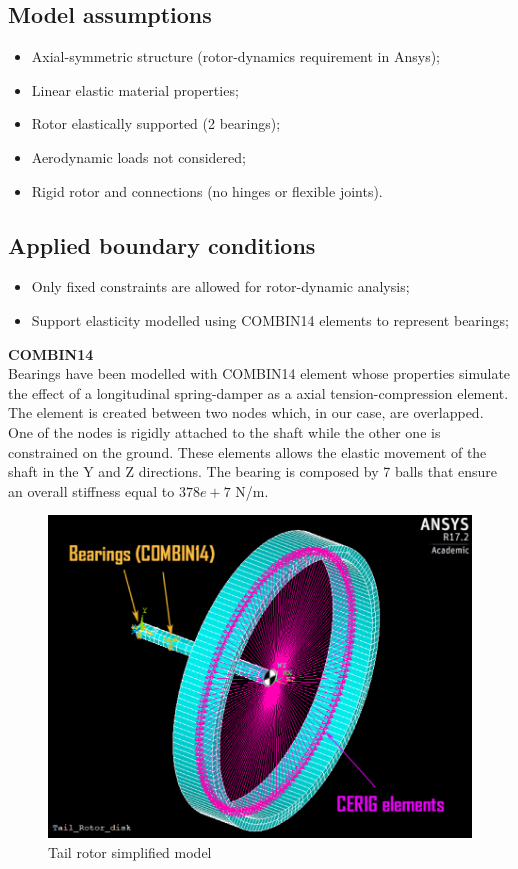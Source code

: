 \subsection*{Model assumptions}
\begin{itemize}
	\item Axial-symmetric structure (rotor-dynamics requirement in Ansys);
	\item Linear elastic material properties;
	\item Rotor elastically supported (2 bearings);
	\item Aerodynamic loads not considered;
	\item Rigid rotor and connections (no hinges or flexible joints).
\end{itemize}



\subsection*{Applied boundary conditions}
\noindent
\begin{itemize}
	\item Only fixed constraints are allowed for rotor-dynamic analysis;
	\item Support elasticity modelled using COMBIN14 elements to represent bearings;
\end{itemize}

\noindent
\textbf{COMBIN14} \\
Bearings have been modelled with COMBIN14 element whose properties simulate the effect of a longitudinal spring-damper as a axial tension-compression element.
The element is created between two nodes which, in our case, are overlapped. One of the nodes is rigidly attached to the shaft while the other one is constrained on the ground. These elements allows the elastic movement of the shaft in the Y and Z directions. The bearing is composed by 7 balls that ensure an overall stiffness equal to $378e+7$ N/m.\\

\medskip
\begin{figure}[h]
	\begin{center}
		\centering  		 		
		\includegraphics[width=0.55\linewidth]{PICTURES/5_Rotordynamics/2.png}
	\end{center}
	\caption {Tail rotor simplified model}
\end{figure}

